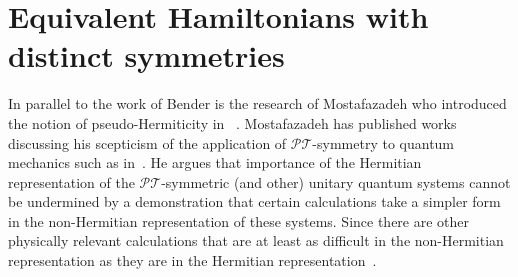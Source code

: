 \documentclass[12pt, a4paper]{report}
\newcommand\PT{\(\mathcal{PT}\)}
\begin{document}
\section{Equivalent Hamiltonians with distinct symmetries}\label{EqHH}
In parallel to the work of Bender is the research of Mostafazadeh who introduced the notion of pseudo-Hermiticity in ~\cite{Mostafazadeh, Pseudo-HermiticityII, Pseudo-HermiticityIII, Mostafazadeh2, Mostafazadeh_2002}. Mostafazadeh has published works discussing his scepticism of the application of \PT-symmetry to quantum mechanics such as in~\cite{Critique}. He argues that importance of the Hermitian representation of the \PT-symmetric (and other) unitary quantum systems cannot be undermined by a demonstration that certain calculations take a simpler form in the non-Hermitian representation of these systems. Since there are other physically relevant calculations that are at least as difficult in the non-Hermitian representation as they are in the Hermitian representation~\cite{Mostafazadeh_comment}.
\end{document}
